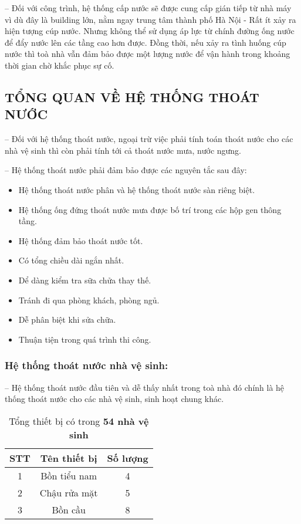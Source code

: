 		-- Đối với công trình, hệ thống cấp nước sẽ được cung cấp gián tiếp từ nhà máy vì dù đây là building lớn, nằm ngay trung tâm thành phố Hà Nội - Rất ít xảy ra hiện tượng cúp nước. Nhưng không thể sử dụng áp lực từ chính đường ống nước để đẩy nước lên các tầng cao hơn được. Đồng thời, nếu xảy ra tình huống cúp nước thì toà nhà vẫn đảm bảo được một lượng nước để vận hành trong khoảng thời gian chờ khắc phục sự cố.
		
	\subsection{TỔNG QUAN VỀ HỆ THỐNG THOÁT NƯỚC}
	-- Đối với hệ thống thoát nước, ngoại trừ việc phải tính toán thoát nước cho các nhà vệ sinh thì còn phải tính tới cả thoát nước mưa, nước ngưng.
	
	-- Hệ thống thoát nước phải đảm bảo được các nguyên tắc sau đây:
	\begin{itemize}
		\setlength\itemsep{1mm}
		\item Hệ thống thoát nước phân và hệ thống thoát nước sàn riêng biệt. 
		\item Hệ thống ống đứng thoát nước mưa được bố trí trong các hộp gen thông tầng.
		\item Hệ thống đảm bảo thoát nước tốt. 
		\item Có tổng chiều dài ngắn nhất. 
		\item Dể dàng kiểm tra sữa chửa thay thế. 
		\item Tránh đi qua phòng khách, phòng ngủ. 
		\item Dễ phân biệt khi sửa chữa. 
		\item Thuận tiện trong quá trình thi công. 
	\end{itemize}
	\subsubsection{Hệ thống thoát nước nhà vệ sinh:}	
	-- Hệ thống thoát nước đầu tiên và dễ thấy nhất trong toà nhà đó chính là hệ thống thoát nước cho các nhà vệ sinh, sinh hoạt chung khác.
	
\begin{table}[H]
		\vspace{-0.5cm}
  		\centering
  		\caption{Tổng thiết bị có trong \textbf{54 nhà vệ sinh}}
    	\begin{tabular}{|c|c|c|}
    	\hline
    	\multicolumn{1}{|c|}{\textbf{STT}} & \multicolumn{1}{c|}{\textbf{Tên thiết bị}} & \multicolumn{1}{c|}{\textbf{Số lượng}} \\
    	\hline
    	1     & Bồn tiểu nam & 4 \\
    	\hline
    	2     & Chậu rửa mặt & 5 \\
    	\hline
    	3     & Bồn cầu & 8 \\
   	 	\hline
    	\end{tabular}%
  		\label{tab:tong_thoat_nvs}
\end{table}
	 
